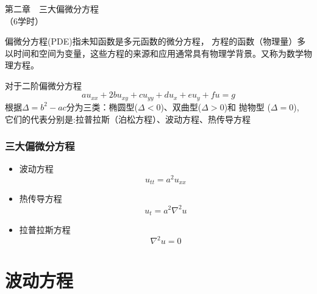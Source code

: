 	\begin{frame}
		\frametitle{}
	    \begin{center}
		{ {\Huge 第二章~~三大偏微分方程\\（6学时）}}
	    \end{center}    
	\end{frame}


\begin{frame}
	\begin{definition}[] 
	偏微分方程(PDE)指未知函数是多元函数的微分方程，
	方程的函数（物理量）多以时间和空间为变量，这些方程的来源和应用通常具有物理学背景。又称为数学物理方程。
	\end{definition}
	对于二阶偏微分方程
	\begin{equation*}
		au_{xx}+2bu_{xy}+cu_{yy}+du_x+eu_y+fu=g
	\end{equation*}
	根据$\Delta=b^2-ac$分为三类：椭圆型($\Delta<0$)、双曲型($\Delta>0$)和 抛物型 ($\Delta=0$),\\
	它们的代表分别是:拉普拉斯（泊松方程）、波动方程、热传导方程
\end{frame}

\begin{frame}
\frametitle{三大偏微分方程}
	\begin{itemize}
	\item  波动方程 
	\begin{equation*}
		u_{tt}=a^2u_{xx}
	\end{equation*}
	\item  热传导方程
	\begin{equation*}
		u_t=a^2 \nabla ^2 u 
	\end{equation*}
	\item  拉普拉斯方程
	\begin{equation*}
		 \nabla ^2 u =0
	\end{equation*}
	\end{itemize}
\end{frame}

\section{波动方程}
